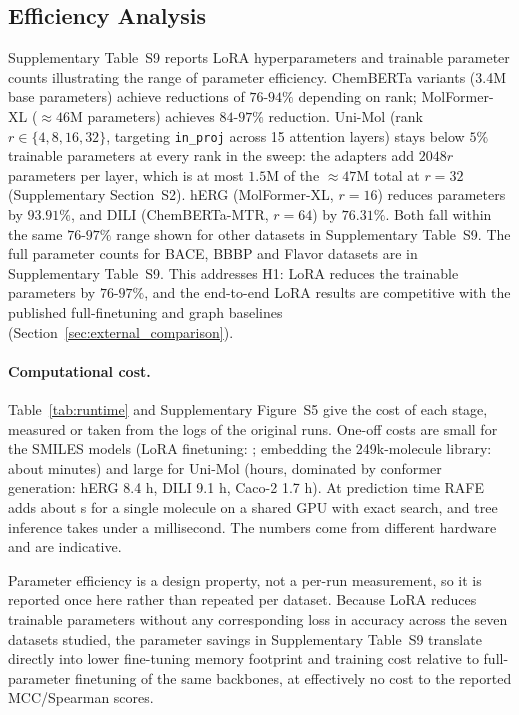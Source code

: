 \documentclass[pdflatex,sn-mathphys-num,Numbered]{sn-jnl}%
\renewcommand{\umhours}{hERG 8.4 h, DILI 9.1 h, Caco-2 1.7 h}
\begin{document}
\subsection{Efficiency Analysis}\label{sec:efficiency}
Supplementary Table~S9 reports LoRA hyperparameters and trainable parameter counts illustrating the range of parameter efficiency. ChemBERTa variants (3.4M base parameters) achieve reductions of $76$-$94\%$ depending on rank; MolFormer-XL ($\approx 46$M parameters) achieves $84$-$97\%$ reduction. Uni-Mol (rank $r \in \{4,8,16,32\}$, targeting \texttt{in\_proj} across 15 attention layers) stays below $5\%$ trainable parameters at every rank in the sweep: the adapters add $2048r$ parameters per layer, which is at most $1.5$M of the $\approx47$M total at $r=32$ (Supplementary Section~S2). hERG (MolFormer-XL, $r=16$) reduces parameters by $93.91\%$, and DILI (ChemBERTa-MTR, $r=64$) by $76.31\%$. Both fall within the same $76$-$97\%$ range shown for other datasets in Supplementary Table~S9. The full parameter counts for BACE, BBBP and Flavor datasets are in Supplementary Table~S9. This addresses H1: LoRA reduces the trainable parameters by $76$-$97\%$, and the end-to-end LoRA results are competitive with the published full-finetuning and graph baselines (Section~\ref{sec:external_comparison}).

\paragraph{Computational cost.} Table~\ref{tab:runtime} and Supplementary Figure~S5 give the cost of each stage, measured or taken from the logs of the original runs. One-off costs are small for the SMILES models (LoRA finetuning: \lorarun{}; embedding the 249k-molecule library: about \zhmin{} minutes) and large for Uni-Mol (hours, dominated by conformer generation: \umhours{}). At prediction time RAFE adds about \raferq{} s for a single molecule on a shared GPU with exact search, and tree inference takes under a millisecond. The numbers come from different hardware and are indicative.

\begin{table}[!ht]
\centering
\caption{Runtime of the pipeline stages.}
\label{tab:runtime}
\footnotesize

\end{table}

Parameter efficiency is a design property, not a per-run measurement, so it is reported once here rather than repeated per dataset. Because LoRA reduces trainable parameters without any corresponding loss in accuracy across the seven datasets studied, the parameter savings in Supplementary Table~S9 translate directly into lower fine-tuning memory footprint and training cost relative to full-parameter finetuning of the same backbones, at effectively no cost to the reported MCC/Spearman scores.
\end{document}
